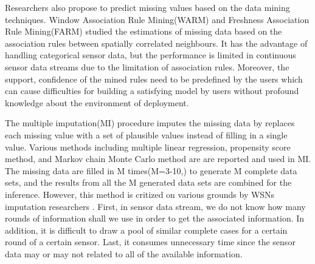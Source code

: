 Researchers also propose to predict missing values based on the data mining techniques. Window Association Rule Mining(WARM)\cite{le2005estimating} and Freshness Association Rule Mining(FARM)\cite{Gruenwald:FARM} studied the estimations of missing data based on the association rules between spatially correlated neighbours. 
It has the advantage of handling categorical sensor data, but the performance is limited in continuous sensor data streams due to the limitation of association rules. Moreover, the support, confidence of the mined rules need to be predefined by the users which can cause difficulties for building a satisfying model by users without profound knowledge about the environment of deployment. 

The multiple imputation(MI) procedure\cite{yuan2000multiple} imputes the missing data by replaces each missing value with a set of plausible values instead of filling in a single value. Various methods including multiple linear regression, propensity score method, and Markov chain Monte Carlo method are are reported and used in MI. The missing data are filled in M times(M=3-10,\cite{Little:hotdeck}) to generate M complete data sets, and the results from all the M generated data sets are combined for the inference\cite{yuan2000multiple}. 
However, this method is critized on various grounds by WSNs imputation researchers\cite{jiang2007estimating} \cite{Gruenwald:FARM}. First, in sensor data stream, we do not know how many rounds of information shall we use in order to get the associated information.
In addition, it is difficult to draw a pool of similar complete cases for a certain round of a certain sensor. 
Last, it consumes unnecessary time since the sensor data may or may not related to all of the available information.



